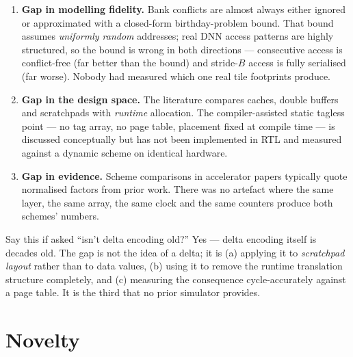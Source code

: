 \documentclass[11pt,a4paper]{article}
\begin{document}
\begin{enumerate}[leftmargin=1.5em,itemsep=3pt]
  \item \textbf{Gap in modelling fidelity.} Bank conflicts are almost always
        either ignored or approximated with a closed-form birthday-problem
        bound. That bound assumes \emph{uniformly random} addresses; real DNN
        access patterns are highly structured, so the bound is wrong in both
        directions --- consecutive access is conflict-free (far better than the
        bound) and stride-$B$ access is fully serialised (far worse). Nobody
        had measured which one real tile footprints produce.
  \item \textbf{Gap in the design space.} The literature compares caches,
        double buffers and scratchpads with \emph{runtime} allocation. The
        compiler-assisted static tagless point --- no tag array, no page table,
        placement fixed at compile time --- is discussed conceptually but has
        not been implemented in RTL and measured against a dynamic scheme on
        identical hardware.
  \item \textbf{Gap in evidence.} Scheme comparisons in accelerator papers
        typically quote normalised factors from prior work. There was no
        artefact where the same layer, the same array, the same clock and the
        same counters produce both schemes' numbers.
\end{enumerate}

\begin{warnbox}{Say this if asked ``isn't delta encoding old?''}
Yes --- delta encoding itself is decades old. The gap is not the idea of a
delta; it is (a) applying it to \emph{scratchpad layout} rather than to data
values, (b) using it to remove the runtime translation structure completely,
and (c) measuring the consequence cycle-accurately against a page table. It is
the third that no prior simulator provides.
\end{warnbox}

\section{Novelty}
\end{document}
